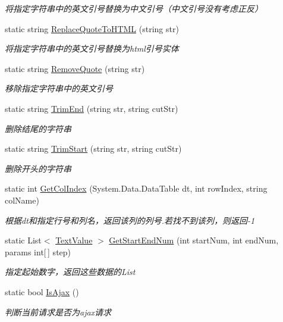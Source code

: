 \begin{DoxyCompactItemize}
\begin{DoxyCompactList}\small\item\em 将指定字符串中的英文引号替换为中文引号（中文引号没有考虑正反） \end{DoxyCompactList}\item 
static string \hyperlink{class_x_c_l_net_tools_1_1_string_hander_1_1_common_adecc464f722d6bc0e3ab9ba42277d730}{Replace\-Quote\-To\-H\-T\-M\-L} (string str)
\begin{DoxyCompactList}\small\item\em 将指定字符串中的英文引号替换为html引号实体 \end{DoxyCompactList}\item 
static string \hyperlink{class_x_c_l_net_tools_1_1_string_hander_1_1_common_a7ac48e68f1f3943c8e8425df41aa52ca}{Remove\-Quote} (string str)
\begin{DoxyCompactList}\small\item\em 移除指定字符串中的英文引号 \end{DoxyCompactList}\item 
static string \hyperlink{class_x_c_l_net_tools_1_1_string_hander_1_1_common_a3ed633ff7c9b12a2d63ebe9eb8fd7dd2}{Trim\-End} (string str, string cut\-Str)
\begin{DoxyCompactList}\small\item\em 删除结尾的字符串 \end{DoxyCompactList}\item 
static string \hyperlink{class_x_c_l_net_tools_1_1_string_hander_1_1_common_afcc9efd028a6a7937e8f75307e78b54c}{Trim\-Start} (string str, string cut\-Str)
\begin{DoxyCompactList}\small\item\em 删除开头的字符串 \end{DoxyCompactList}\item 
static int \hyperlink{class_x_c_l_net_tools_1_1_string_hander_1_1_common_a92809793a5182f189efcfcb49a3f8bc8}{Get\-Col\-Index} (System.\-Data.\-Data\-Table dt, int row\-Index, string col\-Name)
\begin{DoxyCompactList}\small\item\em 根据dt和指定行号和列名，返回该列的列号.\-若找不到该列，则返回-\/1 \end{DoxyCompactList}\item 
static List$<$ \hyperlink{class_x_c_l_net_tools_1_1_entity_1_1_text_value}{Text\-Value} $>$ \hyperlink{class_x_c_l_net_tools_1_1_string_hander_1_1_common_a34f200ef899d3b8ff3bff707f86c24d2}{Get\-Start\-End\-Num} (int start\-Num, int end\-Num, params int\mbox{[}$\,$\mbox{]} step)
\begin{DoxyCompactList}\small\item\em 指定起始数字，返回这些数据的\-List \end{DoxyCompactList}\item 
static bool \hyperlink{class_x_c_l_net_tools_1_1_string_hander_1_1_common_a2573b0ab4c60ce76ab6713ed40339db4}{Is\-Ajax} ()
\begin{DoxyCompactList}\small\item\em 判断当前请求是否为ajax请求 \end{DoxyCompactList}\end{DoxyCompactItemize}
